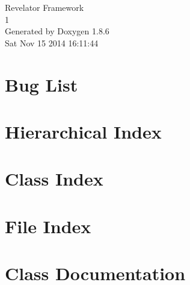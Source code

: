 \documentclass[twoside]{book}
\newcommand{\clearemptydoublepage}{%
  \newpage{\pagestyle{empty}\cleardoublepage}%
}
\begin{document}
\hypersetup{pageanchor=false}
\begin{titlepage}
\vspace*{7cm}
\begin{center}%
{\Large Revelator Framework \\[1ex]\large 1 }\\
\vspace*{1cm}
{\large Generated by Doxygen 1.8.6}\\
\vspace*{0.5cm}
{\small Sat Nov 15 2014 16:11:44}\\
\end{center}
\end{titlepage}
\clearemptydoublepage
\tableofcontents
\clearemptydoublepage
{}
\hypersetup{pageanchor=true}

\chapter{Bug List}
\label{bug}
\hypertarget{bug}{}

\chapter{Hierarchical Index}

\chapter{Class Index}

\chapter{File Index}

\chapter{Class Documentation}

































\end{document}
